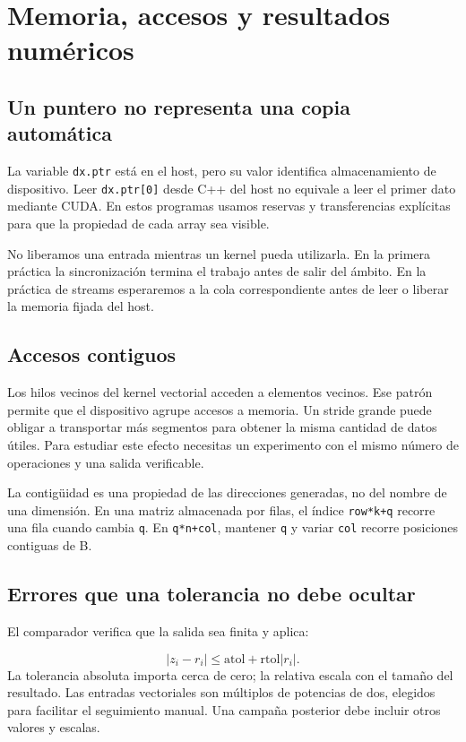 \documentclass[12pt,a4paper,oneside]{report}
\begin{document}
\chapter{Memoria, accesos y resultados numéricos}
\section{Un puntero no representa una copia automática}
La variable \texttt{dx.ptr} está en el host, pero su valor identifica almacenamiento de dispositivo. Leer \texttt{dx.ptr[0]} desde C++ del host no equivale a leer el primer dato mediante CUDA. En estos programas usamos reservas y transferencias explícitas para que la propiedad de cada array sea visible.

No liberamos una entrada mientras un kernel pueda utilizarla. En la primera práctica la sincronización termina el trabajo antes de salir del ámbito. En la práctica de streams esperaremos a la cola correspondiente antes de leer o liberar la memoria fijada del host.

\section{Accesos contiguos}
Los hilos vecinos del kernel vectorial acceden a elementos vecinos. Ese patrón permite que el dispositivo agrupe accesos a memoria. Un stride grande puede obligar a transportar más segmentos para obtener la misma cantidad de datos útiles. Para estudiar este efecto necesitas un experimento con el mismo número de operaciones y una salida verificable.

La contigüidad es una propiedad de las direcciones generadas, no del nombre de una dimensión. En una matriz almacenada por filas, el índice \texttt{row*k+q} recorre una fila cuando cambia \texttt{q}. En \texttt{q*n+col}, mantener \texttt{q} y variar \texttt{col} recorre posiciones contiguas de B.

\section{Errores que una tolerancia no debe ocultar}
El comparador verifica que la salida sea finita y aplica:

\[
|z_i-r_i|\leq \mathrm{atol}+\mathrm{rtol}|r_i|.
\]
La tolerancia absoluta importa cerca de cero; la relativa escala con el tamaño del resultado. Las entradas vectoriales son múltiplos de potencias de dos, elegidos para facilitar el seguimiento manual. Una campaña posterior debe incluir otros valores y escalas.
\end{document}
